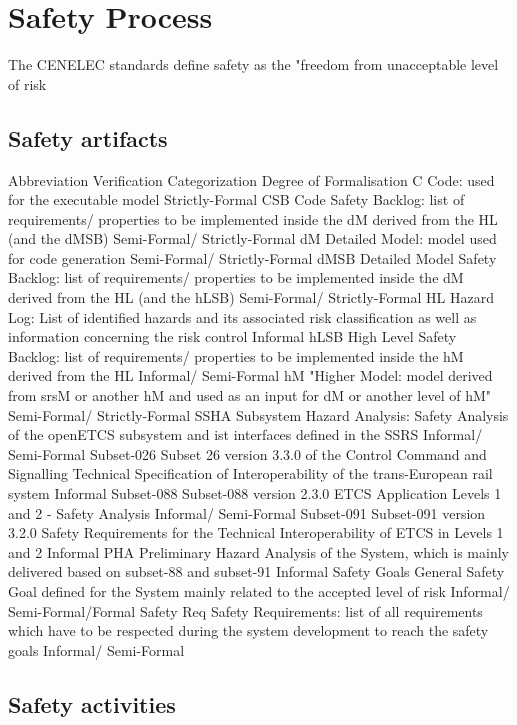\documentclass{template/openetcs_article}
\begin{document}

\section{Safety Process}

The CENELEC standards define safety as the "freedom from unacceptable level of risk  



\subsection{Safety artifacts}

Abbreviation	Verification Categorization	Degree of Formalisation
C	Code: used for the executable model	Strictly-Formal
CSB	Code Safety Backlog: list of requirements/ properties to be implemented inside the dM derived from  the HL (and the dMSB)	Semi-Formal/ Strictly-Formal
dM	Detailed Model: model used for code generation	Semi-Formal/ Strictly-Formal
dMSB	Detailed Model Safety Backlog: list of requirements/ properties to be implemented inside the dM derived from the HL (and  the hLSB)	Semi-Formal/ Strictly-Formal
HL	Hazard Log: List of identified hazards and its associated risk classification as well as information concerning the risk control	Informal
hLSB	High Level Safety Backlog: list of requirements/ properties to be implemented inside the hM derived from the HL	Informal/ Semi-Formal
hM	"Higher Model: model derived from srsM or another hM 
and used as an input for dM or another level of hM"	Semi-Formal/ Strictly-Formal
SSHA	Subsystem Hazard Analysis: Safety Analysis of the openETCS subsystem and ist interfaces defined in the SSRS	Informal/ Semi-Formal
Subset-026	Subset 26 version 3.3.0 of the Control Command and Signalling Technical Specification of Interoperability of the trans-European rail system	Informal
Subset-088	Subset-088 version 2.3.0 ETCS Application Levels 1 and 2 - Safety Analysis	Informal/ Semi-Formal
Subset-091	Subset-091 version 3.2.0 Safety Requirements for the Technical Interoperability of ETCS in Levels 1 and 2	Informal
PHA	Preliminary Hazard Analysis of the System, which is mainly delivered based on subset-88 and subset-91	Informal
Safety Goals	General Safety Goal defined for the System mainly related to the accepted level of risk	Informal/ Semi-Formal/Formal
Safety Req	Safety Requirements: list of all requirements which have to be respected during the system development to reach the safety goals	Informal/ Semi-Formal

\subsection{Safety activities}
\end{document}
